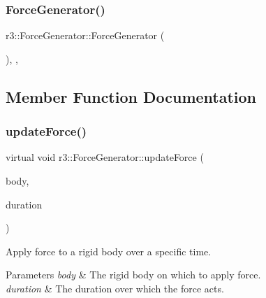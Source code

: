 \mbox{\label{classr3_1_1_force_generator_a7b21e48ccca59631975e0621057a1035}} 
\subsubsection{\texorpdfstring{Force\+Generator()}{ForceGenerator()}}
{\footnotesize\ttfamily r3\+::\+Force\+Generator\+::\+Force\+Generator (\begin{DoxyParamCaption}{ }\end{DoxyParamCaption})\hspace{0.3cm}{\ttfamily [explicit]}, {\ttfamily [protected]}, {\ttfamily [default]}}



\subsection{Member Function Documentation}
\mbox{\label{classr3_1_1_force_generator_a69bebbde8cef792d6636af50037af2aa}} 
\subsubsection{\texorpdfstring{update\+Force()}{updateForce()}}
{\footnotesize\ttfamily virtual void r3\+::\+Force\+Generator\+::update\+Force (\begin{DoxyParamCaption}\item[{\mbox{\hyperlink{classr3_1_1_rigid_body}{Rigid\+Body}} $\ast$}]{body,  }\item[{\mbox{\hyperlink{namespacer3_ab2016b3e3f743fb735afce242f0dc1eb}{real}}}]{duration }\end{DoxyParamCaption})\hspace{0.3cm}{\ttfamily [pure virtual]}}



Apply force to a rigid body over a specific time. 


\begin{DoxyParams}{Parameters}
{\em body} & The rigid body on which to apply force. \\
\hline
{\em duration} & The duration over which the force acts. \\
\hline
\end{DoxyParams}



